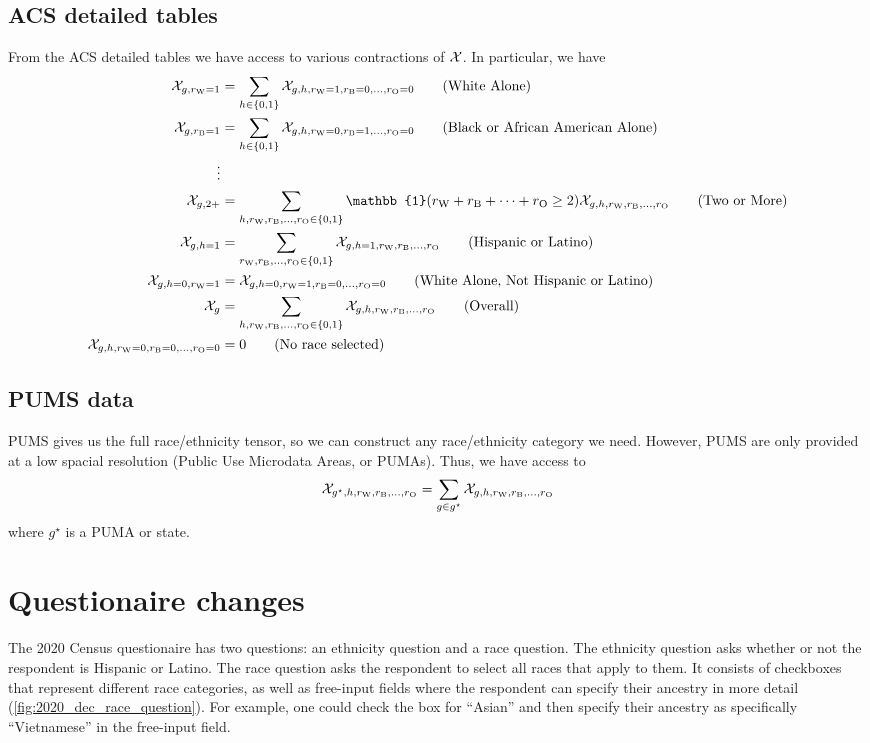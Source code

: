 \documentclass[12pt]{article}
\begin{document}
\subsection{ACS detailed tables}
From the ACS detailed tables we have access to various contractions of $\mathcal{X}$. In particular, we have
\begin{align*}
    \var_{g,\rc{W}=1} &= \sum_{h \in \{0,1\}} \var_{g,h,\rc{W}=1, \rc{B}=0, \dots, \rc{O}=0} \tag{White Alone} \\
    \var_{g,\rc{B}=1} &= \sum_{h \in \{0,1\}} \var_{g,h,\rc{W}=0, \rc{B}=1, \dots, \rc{O}=0} \tag{Black or African American Alone} \\
    \vdots \\
    \var_{g,2+} &= \sum_{h,\rc{W},\rc{B},\dots,\rc{O} \in \{0,1\}} \mathbb{1}(\rc{W} + \rc{B} + \dots + \rc{O} \geq 2)\var_{g,h,\rc{W}, \rc{B}, \dots, \rc{O}} \tag{Two or More} \\
    \var_{g,h=1} &= \sum_{\rc{W},\rc{B},\ldots,\rc{O} \in \{0,1\}} \var_{g,h=1,\rc{W},\rc{B},\ldots,\rc{O}} \tag{Hispanic or Latino} \\
    \var_{g,h=0,\rc{W}=1} &= \var_{g,h=0,\rc{W}=1,\rc{B}=0,\ldots,\rc{O}=0} \tag{White Alone, Not Hispanic or Latino} \\
    \var_{g} &= \sum_{h,\rc{W},\rc{B},\dots,\rc{O} \in \{0,1\}} \var_{g,h,\rc{W}, \rc{B}, \dots, \rc{O}} \tag{Overall} \\
    \var_{g,h,\rc{W}=0,\rc{B}=0,\ldots,\rc{O}=0} &= 0 \tag{No race selected}
\end{align*}

\subsection{PUMS data}
PUMS gives us the full race/ethnicity tensor, so we can construct any race/ethnicity category we need. However, PUMS are only provided at a low spacial resolution (Public Use Microdata Areas, or PUMAs). Thus, we have access to
\begin{equation*}
    \mathcal{X}_{g^\star,h,r_{\textrm{W}},r_{\textrm{B}},\dots,r_{\textrm{O}}} = \sum_{g \in g^\star} \mathcal{X}_{g,h,r_{\textrm{W}}, r_{\textrm{B}}, \dots, r_{\textrm{O}}}
\end{equation*}
where $g^\star$ is a PUMA or state.


\section{Questionaire changes}
The 2020 Census questionaire has two questions: an ethnicity question and a race question. The ethnicity question asks whether or not the respondent is Hispanic or Latino. The race question asks the respondent to select all races that apply to them. It consists of checkboxes that represent different race categories, as well as free-input fields where the respondent can specify their ancestry in more detail (\cref{fig:2020_dec_race_question}). For example, one could check the box for ``Asian'' and then specify their ancestry as specifically ``Vietnamese'' in the free-input field.
\end{document}
